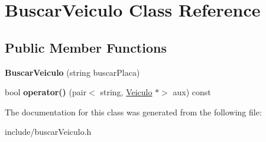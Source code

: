 \hypertarget{classBuscarVeiculo}{}\section{Buscar\+Veiculo Class Reference}
\label{classBuscarVeiculo}
\subsection*{Public Member Functions}
\begin{DoxyCompactItemize}
\item 
\mbox{\label{classBuscarVeiculo_a14ce2be449e47ec3d9b1d53519d41f9a}} 
{\bfseries Buscar\+Veiculo} (string buscar\+Placa)
\item 
\mbox{\label{classBuscarVeiculo_ab15d20685358ea87dfbaa624a1aafd8c}} 
bool {\bfseries operator()} (pair$<$ string, \hyperlink{classVeiculo}{Veiculo} $\ast$$>$ aux) const
\end{DoxyCompactItemize}


The documentation for this class was generated from the following file\+:\begin{DoxyCompactItemize}
\item 
include/buscar\+Veiculo.\+h\end{DoxyCompactItemize}
